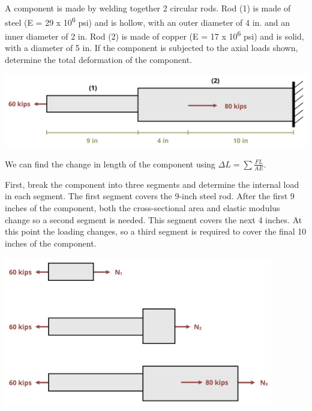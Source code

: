 \documentclass[
  letterpaper,
  DIV=11,
  numbers=noendperiod]{scrreprt}
\theoremstyle{definition}
\theoremstyle{remark}
\begin{document}
\begin{tcolorbox}[enhanced jigsaw, leftrule=.75mm, colbacktitle=quarto-callout-tip-color!10!white, breakable, opacityback=0, colback=white, titlerule=0mm, toprule=.15mm, colframe=quarto-callout-tip-color-frame, coltitle=black, title={Example 5.3}, toptitle=1mm, bottomrule=.15mm, rightrule=.15mm, left=2mm, arc=.35mm, opacitybacktitle=0.6, bottomtitle=1mm]

A component is made by welding together 2 circular rods. Rod (1) is made
of steel (E = 29 x 10\textsuperscript{6} psi) and is hollow, with an
outer diameter of 4 in. and an inner diameter of 2 in. Rod (2) is made
of copper (E = 17 x 10\textsuperscript{6} psi) and is solid, with a
diameter of 5 in. If the component is subjected to the axial loads
shown, determine the total deformation of the component.

\begin{center}
\includegraphics{images/PNGs/Example 5.3 part 1.png}
\end{center}

\begin{tcolorbox}[enhanced jigsaw, leftrule=.75mm, colbacktitle=quarto-callout-tip-color!10!white, breakable, opacityback=0, colback=white, titlerule=0mm, toprule=.15mm, colframe=quarto-callout-tip-color-frame, coltitle=black, title={Solution}, toptitle=1mm, bottomrule=.15mm, rightrule=.15mm, left=2mm, arc=.35mm, opacitybacktitle=0.6, bottomtitle=1mm]

We can find the change in length of the component using
\(\Delta L=\sum \frac{F L}{A E}\).

First, break the component into three segments and determine the
internal load in each segment. The first segment covers the 9-inch steel
rod. After the first 9 inches of the component, both the cross-sectional
area and elastic modulus change so a second segment is needed. This
segment covers the next 4 inches. At this point the loading changes, so
a third segment is required to cover the final 10 inches of the
component.

\begin{center}
\includegraphics[width=4.625in,height=\textheight]{images/PNGs/Example 5.3 part 2.png}
\end{center}


\end{tcolorbox}
\end{tcolorbox}
\end{document}
